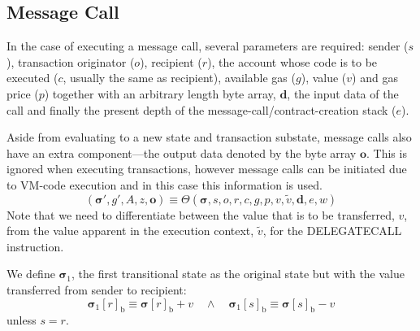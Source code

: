 \documentclass[9pt,oneside]{amsart}
\begin{document}
\begin{multicols}{2}
\section{Message Call} \label{ch:call}
In the case of executing a message call, several parameters are required: sender ($s$), transaction originator ($o$), recipient ($r$), the account whose code is to be executed ($c$, usually the same as recipient), available gas ($g$), value ($v$) and gas price ($p$) together with an arbitrary length byte array, $\mathbf{d}$, the input data of the call and finally the present depth of the message-call/contract-creation stack ($e$).

Aside from evaluating to a new state and transaction substate, message calls also have an extra component---the output data denoted by the byte array $\mathbf{o}$. This is ignored when executing transactions, however message calls can be initiated due to VM-code execution and in this case this information is used.
\begin{equation}
(\boldsymbol{\sigma}', g', A, z, \mathbf{o}) \equiv \Theta(\boldsymbol{\sigma}, s, o, r, c, g, p, v, \tilde{v}, \mathbf{d}, e, w)
\end{equation}
Note that we need to differentiate between the value that is to be transferred, $v$, from the value apparent in the execution context, $\tilde{v}$, for the {\small DELEGATECALL} instruction.

We define $\boldsymbol{\sigma}_1$, the first transitional state as the original state but with the value transferred from sender to recipient:
\begin{equation}
\boldsymbol{\sigma}_1[r]_{\mathrm{b}} \equiv \boldsymbol{\sigma}[r]_{\mathrm{b}} + v \quad\wedge\quad \boldsymbol{\sigma}_1[s]_{\mathrm{b}} \equiv \boldsymbol{\sigma}[s]_{\mathrm{b}} - v
\end{equation}
unless $s = r$.


\end{multicols}
\end{document}
